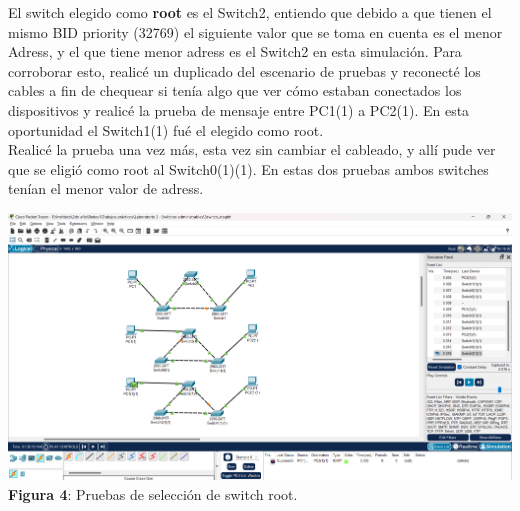 \documentclass{article}
\begin{document}
    \pagebreak

    El switch elegido como {\bfseries root} es el Switch2, entiendo que debido a que tienen el mismo BID priority (32769) el siguiente valor que se toma en cuenta es el menor Adress, y el que tiene menor adress es el Switch2 en esta simulación. Para corroborar esto, realicé un duplicado del escenario de pruebas y reconecté los cables a fin de chequear si tenía algo que ver cómo estaban conectados los dispositivos y realicé la prueba de mensaje entre PC1(1) a PC2(1). En esta oportunidad el Switch1(1) fué el elegido como root.\\
    Realicé la prueba una vez más, esta vez sin cambiar el cableado, y allí pude ver que se eligió como root al Switch0(1)(1). En estas dos pruebas ambos switches tenían el menor valor de adress.

    \begin{center}
        \includegraphics[width=0.875\linewidth]{img_05} 
        \linebreak
        \small {\bfseries Figura 4}: Pruebas de selección de switch root.
    \end{center}
\end{document}
